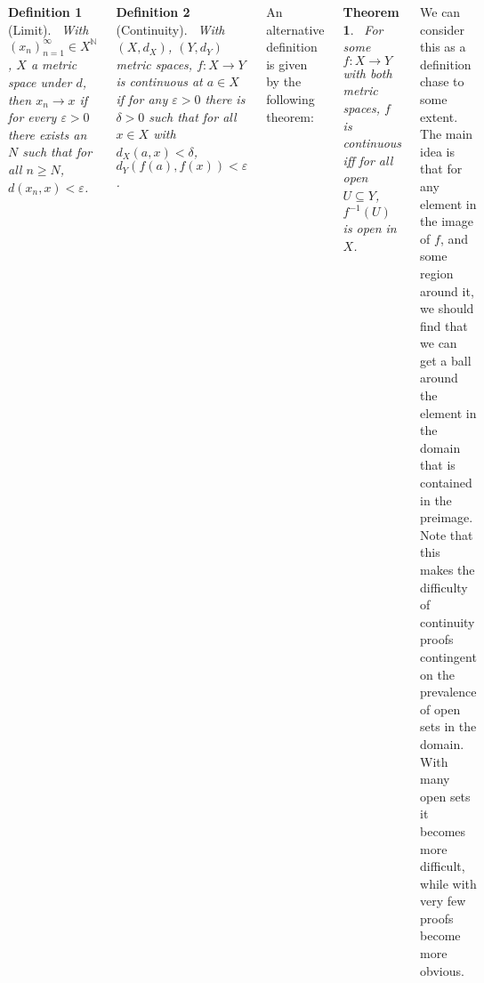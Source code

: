 \documentclass{tikzposter} %
\newtheorem{theorem}{Theorem}
\newtheorem{definition}{Definition}
\begin{document}
\begin{columns}
{  \begin{definition}[Limit]
  \ With $(x_{n})_{n=1}^{\infty} \in X^{\mathbb{N}}$, $X$ a metric space under $d$, then $x_{n} \to x$ if for every $\varepsilon > 0$ there exists an $N$ such that for all $n \ge N$, $d(x_{n}, x) < \varepsilon$.
  \end{definition}
  \hphantom{}
  \begin{definition}[Continuity]
  \  With $(X, d_{X})$, $(Y, d_{Y})$ metric spaces, $f : X \to Y$ is continuous at $a \in X$ if for any $\varepsilon > 0$ there is $\delta > 0$ such that for all $x \in X$ with $d_{X}(a, x) < \delta$, $d_{Y}(f(a), f(x)) < \varepsilon$.
  \end{definition}
  \hphantom{}

  An alternative definition is given by the following theorem:
  \begin{theorem}
  \ For some $f : X \to Y$ with both metric spaces, $f$ is continuous iff for all open $U \subseteq Y$, $f^{-1}(U)$ is open in $X$.
  \end{theorem}
  \hphantom{}

  We can consider this as a definition chase to some extent. The main idea is that for any element in the image of $f$, and some region around it, we should find that we can get a ball around the element in the domain that is contained in the preimage. \\

  Note that this makes the difficulty of continuity proofs contingent on the prevalence of open sets in the domain. With many open sets it becomes more difficult, while with very few proofs become more obvious.
}

\end{columns}
\end{document}

